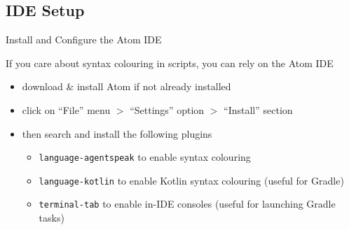 \documentclass[presentation]{beamer}\mode<presentation>{\usetheme{AMSBolognaFC}}
\begin{document}
\subsection{IDE Setup}

\begin{frame}[c]{Install and Configure the Atom IDE}
    
    If you care about syntax colouring in \jason{} scripts, you can rely on the Atom IDE
    \vfill
    \begin{itemize}
        \item download \& install Atom if not already installed
        \begin{center}
        \end{center}
        
        \vfill
        
        \item click on \alert{``File'' menu $>$ ``Settings'' option $>$ ``Install'' section }
        
        \vfill
        
        \item then search and install the following plugins
        \begin{itemize}
            \item \alert{\texttt{language-agentspeak}} to enable \jason{} syntax colouring
            \item \alert{\texttt{language-kotlin}} to enable Kotlin syntax colouring (useful for Gradle)
            \item \alert{\texttt{terminal-tab}} to enable in-IDE consoles (useful for launching Gradle tasks)
        \end{itemize}
    \end{itemize}
    
\end{frame}
\end{document}
